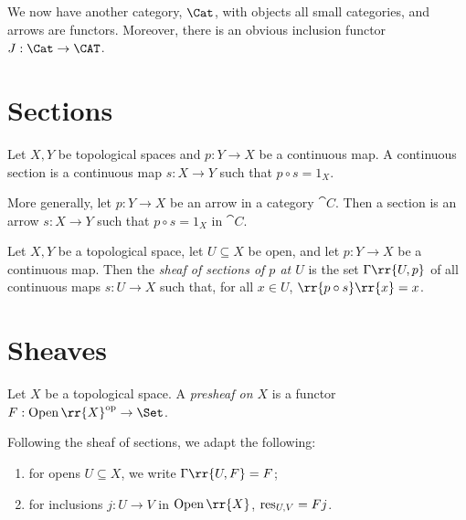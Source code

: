\documentclass{article}
\begin{document}
\begin{example}
  We now have another category, $\Cat$, with objects all small categories, and
  arrows are functors. Moreover, there is an obvious inclusion functor
  $J:\Cat\to\CAT$.
\end{example}

\section{Sections}\label{sec:sections}

\begin{definition}
  Let $X,Y$ be topological spaces and $p:Y\to X$ be a continuous map. A continuous section
  is a continuous map $s:X\to Y$ such that $p \circ s = 1_X$.

  More generally, let $p:Y\to X$ be an arrow in a category $\cat{C}$. Then a section
  is an arrow $s:X\to Y$ such that $p\circ s=1_X$ in $\cat{C}$.
\end{definition}

\begin{definition}
  Let $X,Y$ be a topological space, let $U\subseteq X$ be open, and let $p:Y\to X$ be
  a continuous map. Then the \emph{sheaf of sections of $p$ at $U$} is the set
  $\Gamma\rr{U,p}$ of all continuous maps $s:U\to X$ such that, for all $x\in U$,
  $\rr{p\circ s}\rr{x}=x$.
\end{definition}

\missingexample

\section{Sheaves}\label{sec:sheaves}

\begin{definition}
  Let $X$ be a topological space. A \emph{presheaf on $X$} is a functor
  $F:\Open\rr{X}^{\text{op}}\to\Set$.
\end{definition}

\begin{notation}
  Following the sheaf of sections, we adapt the following:
  \begin{enumerate}
    \item for opens $U\subseteq X$, we write $\Gamma\rr{U,F}=F$;
    \item for inclusions $j:U\to V$ in $\Open\rr{X}$, $\operatorname{res}_{U,V}=Fj$.
  \end{enumerate}
\end{notation}
\end{document}

